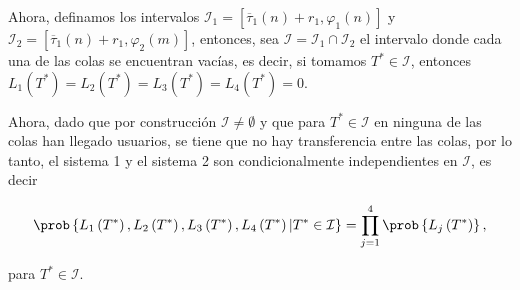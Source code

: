 Ahora, definamos los intervalos $\mathcal{I}_{1}=\left[\overline{\tau}_{1}\left(n\right)+r_{1},\varphi_{1}\left(n\right)\right]$  y $\mathcal{I}_{2}=\left[\overline{\tau}_{1}\left(n\right)+r_{1},\varphi_{2}\left(m\right)\right]$, entonces, sea $\mathcal{I}=\mathcal{I}_{1}\cap\mathcal{I}_{2}$ el intervalo donde cada una de las colas se encuentran vac\'ias, es decir, si tomamos $T^{*}\in\mathcal{I}$, entonces  $L_{1}\left(T^{*}\right)=L_{2}\left(T^{*}\right)=L_{3}\left(T^{*}\right)=L_{4}\left(T^{*}\right)=0$.

Ahora, dado que por construcci\'on $\mathcal{I}\neq\emptyset$ y que para $T^{*}\in\mathcal{I}$ en ninguna de las colas han llegado usuarios, se tiene que no hay transferencia entre las colas, por lo tanto, el sistema 1 y el sistema 2 son condicionalmente independientes en $\mathcal{I}$, es decir

\begin{eqnarray}
\prob\left\{L_{1}\left(T^{*}\right),L_{2}\left(T^{*}\right),L_{3}\left(T^{*}\right),L_{4}\left(T^{*}\right)|T^{*}\in\mathcal{I}\right\}=\prod_{j=1}^{4}\prob\left\{L_{j}\left(T^{*}\right)\right\},
\end{eqnarray}

para $T^{*}\in\mathcal{I}$. 



























